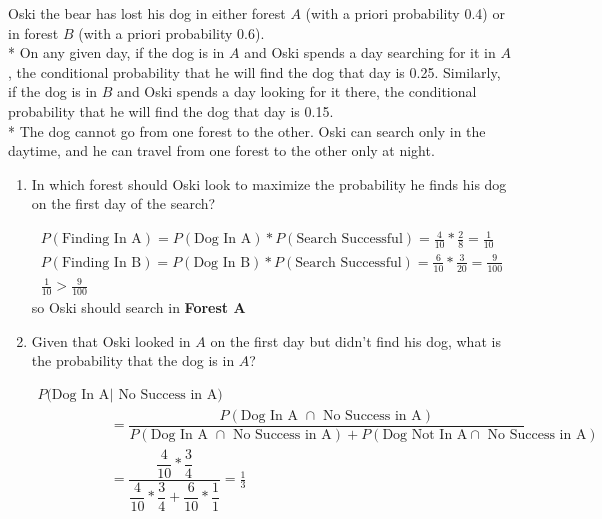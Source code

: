 \question Oski the bear has lost his dog in either forest $A$ (with a 
priori probability 0.4) or in forest $B$ (with a priori probability 0.6). \\*                   
On any given day, if the dog is in $A$ and Oski spends a day searching 
for it in $A$, the conditional probability that he will find the dog 
that day is 0.25. Similarly, if the dog is in $B$ and Oski spends a day 
looking for it there, the conditional probability that he will find the 
dog that day is 0.15. \\*               
The dog cannot go from one forest to the other. Oski can search only in 
the daytime, and he can travel from one forest to the other only at night.

\begin{enumerate}[label=(\alph*)]
\item  In which forest should Oski look to maximize the probability he 
finds his dog on the first day of the search?     
\begin{solution}[3cm]
\begin{align*}
P(\text{Finding In A}) = P(\text{Dog In A}) * P(\text{Search Successful}) 
= \frac{4}{10} *  \frac{2}{8} = \frac{1}{10} \\
    P(\text{Finding In B}) = P(\text{Dog In B}) * 
    P(\text{Search Successful}) = \frac{6}{10} 
    * \frac{3}{20} = \frac{9}{100}\\
    \frac{1}{10} > \frac{9}{100}
\end{align*} so Oski should search in \textbf{Forest A}
\end{solution}

\item  Given that Oski looked in $A$ on the first day but didn’t find 
his dog, what is the probability that the dog is in $A$?
\begin{solution}[2cm]
\begin{align*}
P(\text{Dog In A } &\mid \text{ No Success in A}) 
\\ &=  \dfrac{P(\text{Dog In A } \cap \text{ No Success in A})}{P(\text{Dog In A } \cap \text{ No Success in A}) + 
P(\text{Dog Not In A} \cap \text{ No Success in A})} \\ 
&= \dfrac{\dfrac{4}{10} * \dfrac{3}{4} }{\dfrac{4}{10} * \dfrac{3}{4} + 
\dfrac{6}{10} * \dfrac{1}{1}}
                    = \frac{1}{3}    
\end{align*}
\end{solution}


\end{enumerate}

